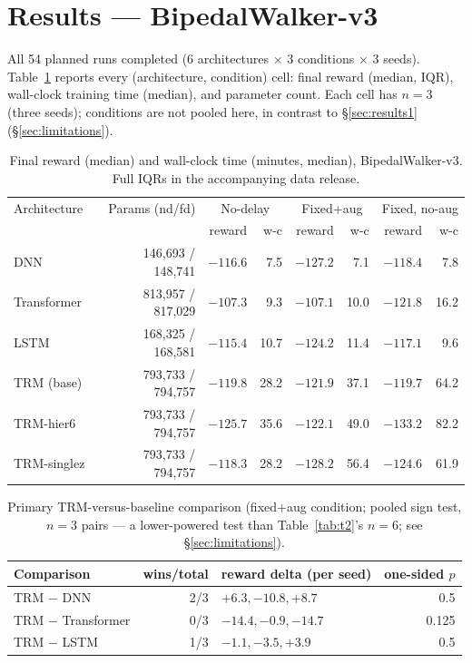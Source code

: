\documentclass[11pt]{article}
\begin{document}
\section{Results --- BipedalWalker-v3}
\label{sec:results2}

All 54 planned runs completed (6 architectures $\times$ 3 conditions $\times$ 3 seeds). Table~\ref{tab:t3} reports every (architecture, condition) cell: final reward (median, IQR), wall-clock training time (median), and parameter count. Each cell has $n=3$ (three seeds); conditions are not pooled here, in contrast to \S\ref{sec:results1} (\S\ref{sec:limitations}).

\begin{table}[h]
\centering
\scriptsize
\begin{tabular}{lrrrrrrr}
\toprule
Architecture & Params (nd/fd) & \multicolumn{2}{c}{No-delay} & \multicolumn{2}{c}{Fixed+aug} & \multicolumn{2}{c}{Fixed, no-aug} \\
 & & reward & w-c & reward & w-c & reward & w-c \\
\midrule
DNN & 146{,}693 / 148{,}741 & $-116.6$ & 7.5 & $-127.2$ & 7.1 & $-118.4$ & 7.8 \\
Transformer & 813{,}957 / 817{,}029 & $-107.3$ & 9.3 & $-107.1$ & 10.0 & $-121.8$ & 16.2 \\
LSTM & 168{,}325 / 168{,}581 & $-115.4$ & 10.7 & $-124.2$ & 11.4 & $-117.1$ & 9.6 \\
TRM (base) & 793{,}733 / 794{,}757 & $-119.8$ & 28.2 & $-121.9$ & 37.1 & $-119.7$ & 64.2 \\
TRM-hier6 & 793{,}733 / 794{,}757 & $-125.7$ & 35.6 & $-122.1$ & 49.0 & $-133.2$ & 82.2 \\
TRM-singlez & 793{,}733 / 794{,}757 & $-118.3$ & 28.2 & $-128.2$ & 56.4 & $-124.6$ & 61.9 \\
\bottomrule
\end{tabular}
\caption{Final reward (median) and wall-clock time (minutes, median), BipedalWalker-v3. Full IQRs in the accompanying data release.}
\label{tab:t3}
\end{table}

\begin{table}[h]
\centering
\small
\begin{tabular}{lrlr}
\toprule
Comparison & wins/total & reward delta (per seed) & one-sided $p$ \\
\midrule
TRM $-$ DNN & 2/3 & $+6.3, -10.8, +8.7$ & 0.5 \\
TRM $-$ Transformer & 0/3 & $-14.4, -0.9, -14.7$ & 0.125 \\
TRM $-$ LSTM & 1/3 & $-1.1, -3.5, +3.9$ & 0.5 \\
\bottomrule
\end{tabular}
\caption{Primary TRM-versus-baseline comparison (fixed+aug condition; pooled sign test, $n=3$ pairs --- a lower-powered test than Table~\ref{tab:t2}'s $n=6$; see \S\ref{sec:limitations}).}
\label{tab:t4}
\end{table}
\end{document}
